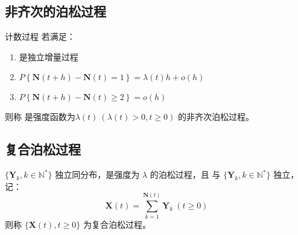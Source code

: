     \subsection{非齐次的泊松过程}
        \begin{definition}[非齐次泊松过程]
            计数过程 \CountingProcess 若满足：
            \begin{enumerate}[label=(\arabic*).]
                \item \CountingProcess 是独立增量过程
                \item $P\left\{ \textbf{N}(t + h) - \textbf{N}(t) = 1 \right\} = \lambda(t) h + o(h)$
                \item $P\left\{ \textbf{N}(t + h) - \textbf{N}(t) \geq 2 \right\} = o(h)$
            \end{enumerate}
            则称 \CountingProcess 是强度函数为$\lambda(t)\ (\lambda(t) > 0, t \geq 0)$ 的非齐次泊松过程。
        \end{definition}
    \subsection{复合泊松过程}
        \begin{definition}[复合泊松过程]
            $\{\textbf{Y}_k, k \in \mathbb{N}^* \}$ 独立同分布，\CountingProcess 是强度为 $\lambda$ 的泊松过程，且 \CountingProcess 与 $\{\textbf{Y}_k, k \in \mathbb{N}^* \}$ 独立，记：
            $$
            \textbf{X}(t) = \sum\limits_{k = 1}^{\textbf{N}(t)} \textbf{Y}_k\ (t \geq 0)
            $$
            则称 $\{\textbf{X}(t), t \geq 0\}$ 为复合泊松过程。
        \end{definition}